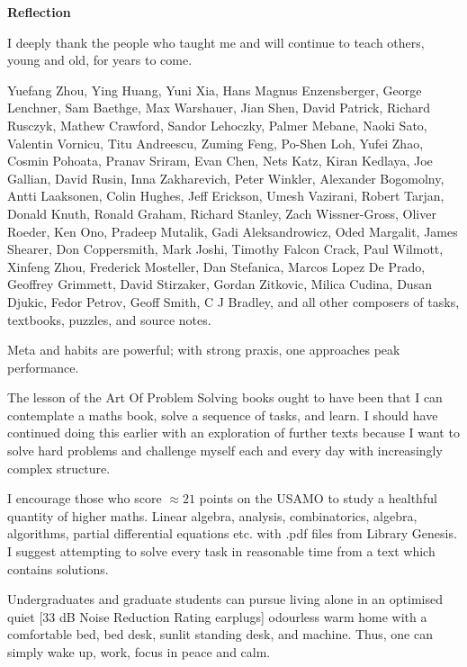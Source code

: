 \newpage

\onecolumn

\textbf{Reflection}

I deeply thank the people who taught me and will continue to teach others, young and old, for years to come.

Yuefang Zhou, Ying Huang, Yuni Xia, Hans Magnus Enzensberger, George Lenchner, Sam Baethge, Max Warshauer, Jian Shen, David Patrick, Richard Rusczyk, Mathew Crawford, Sandor Lehoczky, Palmer Mebane, Naoki Sato, Valentin Vornicu, Titu Andreescu, Zuming Feng, Po-Shen Loh, Yufei Zhao, Cosmin Pohoata, Pranav Sriram, Evan Chen, Nets Katz, Kiran Kedlaya, Joe Gallian, David Rusin, Inna Zakharevich, Peter Winkler, Alexander Bogomolny, Antti Laaksonen, Colin Hughes, Jeff Erickson, Umesh Vazirani, Robert Tarjan, Donald Knuth, Ronald Graham, Richard Stanley, Zach Wissner-Gross, Oliver Roeder, Ken Ono, Pradeep Mutalik, Gadi Aleksandrowicz, Oded Margalit, James Shearer, Don Coppersmith, Mark Joshi, Timothy Falcon Crack, Paul Wilmott, Xinfeng Zhou, Frederick Mosteller, Dan Stefanica, Marcos Lopez De Prado, Geoffrey Grimmett, David Stirzaker, Gordan Zitkovic, Milica Cudina, Dusan Djukic, Fedor Petrov, Geoff Smith, C J Bradley, and all other composers of tasks, textbooks, puzzles, and source notes.

Meta and habits are powerful; with strong praxis, one approaches peak performance.

The lesson of the Art Of Problem Solving books ought to have been that I can contemplate a maths book, solve a sequence of tasks, and learn. I should have continued doing this earlier with an exploration of further texts because I want to solve hard problems and challenge myself each and every day with increasingly complex structure.

I encourage those who score $\approx 21$ points on the USAMO to study a healthful quantity of higher maths. Linear algebra, analysis, combinatorics, algebra, algorithms, partial differential equations etc. with .pdf files from Library Genesis. I suggest attempting to solve every task in reasonable time from a text which contains solutions.

Undergraduates and graduate students can pursue living alone in an optimised quiet [$33$ dB Noise Reduction Rating earplugs] odourless warm home with a comfortable bed, bed desk, sunlit standing desk, and machine. Thus, one can simply wake up, work, focus in peace and calm.
